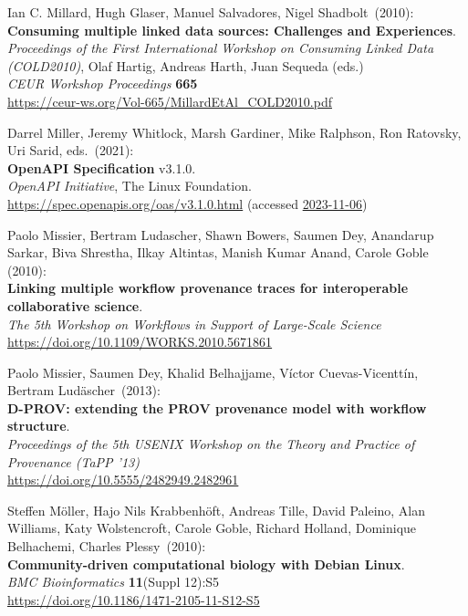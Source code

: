 \begin{thebibliography}{9}
Ian C. Millard, Hugh Glaser, Manuel Salvadores, Nigel Shadbolt~(2010): \\
\textbf{Consuming multiple linked data sources: Challenges and Experiences}.\\
\emph{Proceedings of the First International Workshop on Consuming Linked Data (COLD2010)}, 
Olaf Hartig, Andreas Harth, Juan Sequeda (eds.) \\
\emph{CEUR Workshop Proceedings} \textbf{665}\\
\url{https://ceur-ws.org/Vol-665/MillardEtAl_COLD2010.pdf}

Darrel Miller, Jeremy Whitlock, Marsh Gardiner, Mike Ralphson, Ron
Ratovsky, Uri Sarid, eds.~(2021): \\
\textbf{OpenAPI Specification} v3.1.0.\\
\emph{OpenAPI Initiative}, The Linux Foundation.\\
\url{https://spec.openapis.org/oas/v3.1.0.html} 
(accessed \href{https://web.archive.org/web/20231106014946/https://spec.openapis.org/oas/v3.1.0.html}{2023-11-06})

Paolo Missier, Bertram Ludascher, Shawn Bowers, Saumen Dey, Anandarup Sarkar, Biva Shrestha, Ilkay Altintas, Manish Kumar Anand, Carole Goble (2010):\\
\textbf{Linking multiple workflow provenance traces for interoperable collaborative science}.\\
\emph{The 5th Workshop on Workflows in Support of Large-Scale Science} \\
\url{https://doi.org/10.1109/WORKS.2010.5671861}

Paolo Missier, Saumen Dey, Khalid Belhajjame, Víctor Cuevas-Vicenttín, Bertram Ludäscher~(2013): \\
\textbf{D-PROV: extending the PROV provenance model with workflow structure}.\\
\emph{Proceedings of the 5th USENIX Workshop on the Theory and Practice of Provenance (TaPP '13)}\\
\url{https://doi.org/10.5555/2482949.2482961}

Steffen Möller, Hajo Nils Krabbenhöft, Andreas Tille, David
Paleino, Alan Williams, Katy Wolstencroft, Carole Goble, Richard
Holland, Dominique Belhachemi, Charles Plessy~(2010): \\
\textbf{Community-driven computational biology with Debian Linux}.\\
\emph{BMC Bioinformatics} \textbf{11}(Suppl 12):S5\\
\url{https://doi.org/10.1186/1471-2105-11-S12-S5}


\end{thebibliography}
